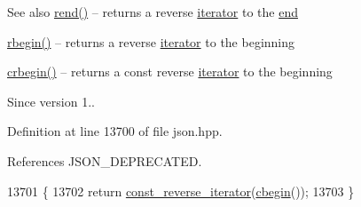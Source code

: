 \begin{DoxySeeAlso}{See also}
\hyperlink{classnlohmann_1_1basic__json_ac77aed0925d447744676725ab0b6d535}{rend()} -- returns a reverse \hyperlink{classnlohmann_1_1basic__json_a099316232c76c034030a38faa6e34dca}{iterator} to the \hyperlink{classnlohmann_1_1basic__json_a13e032a02a7fd8a93fdddc2fcbc4763c}{end} 

\hyperlink{classnlohmann_1_1basic__json_a1ef93e2006dbe52667294f5ef38b0b10}{rbegin()} -- returns a reverse \hyperlink{classnlohmann_1_1basic__json_a099316232c76c034030a38faa6e34dca}{iterator} to the beginning 

\hyperlink{classnlohmann_1_1basic__json_a1e0769d22d54573f294da0e5c6abc9de}{crbegin()} -- returns a const reverse \hyperlink{classnlohmann_1_1basic__json_a099316232c76c034030a38faa6e34dca}{iterator} to the beginning
\end{DoxySeeAlso}
\begin{DoxySince}{Since}
version 1.. 
\end{DoxySince}


Definition at line 13700 of file json.\+hpp.



References J\+S\+O\+N\+\_\+\+D\+E\+P\+R\+E\+C\+A\+T\+ED.


\begin{DoxyCode}
13701     \{
13702         \textcolor{keywordflow}{return} \hyperlink{classnlohmann_1_1basic__json_a72be3c24bfa24f0993d6c11af03e7404}{const\_reverse\_iterator}(\hyperlink{classnlohmann_1_1basic__json_ad865d6c291b237ae508d5cb2146b5877}{cbegin}());
13703     \}
\end{DoxyCode}
\mbox{\label{classnlohmann_1_1basic__json_a543bd5f7490de54c875b2c0912dc9a49}} 
